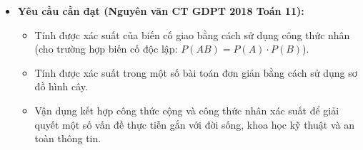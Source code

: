 \documentclass[12pt, a4paper]{article}
\begin{document}
\begin{itemize}[leftmargin=1.2cm]
    \item \textbf{Yêu cầu cần đạt (Nguyên văn CT GDPT 2018 Toán 11):}
    \begin{itemize}[leftmargin=0.6cm]
        \item Tính được xác suất của biến cố giao bằng cách sử dụng công thức nhân (cho trường hợp biến cố độc lập: $P(AB) = P(A) \cdot P(B)$).
        \item Tính được xác suất trong một số bài toán đơn giản bằng cách sử dụng sơ đồ hình cây.
        \item Vận dụng kết hợp công thức cộng và công thức nhân xác suất để giải quyết một số vấn đề thực tiễn gắn với đời sống, khoa học kỹ thuật và an toàn thông tin.
    \end{itemize}


\end{itemize}
\end{document}
